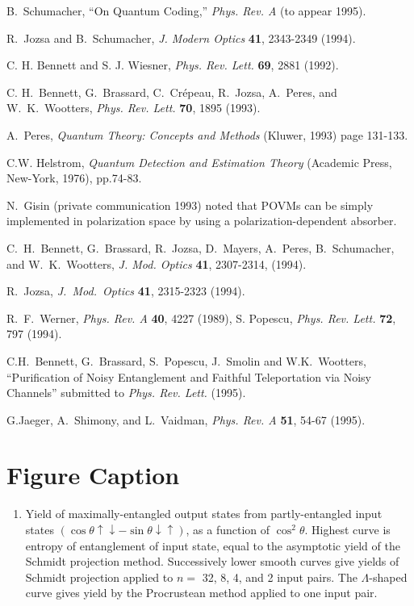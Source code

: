 \begin{thebibliography}{99}
 
 B.~Schumacher, ``On Quantum Coding,''
{\em Phys. Rev. A\/} (to appear 1995).
 
 R.~Jozsa and B.~Schumacher,
{\em J. Modern Optics\/} {\bf 41}, 2343-2349 (1994).
 
 C. H. Bennett and S. J. Wiesner, {\em Phys. Rev. Lett.\/}
{\bf69}, 2881 (1992).
 
 C. H.~Bennett, G.~Brassard, C.~Cr\'epeau, R.~Jozsa,
A.~Peres, and W.~K.~Wootters, {\em Phys. Rev. Lett.} {\bf 70}, 1895
(1993).
 
 A.~Peres, {\em Quantum Theory: Concepts and Methods\/}
(Kluwer, 1993) page 131-133.
 
 C.W. Helstrom,
{\em Quantum Detection and Estimation Theory}
(Academic Press, New-York, 1976), pp.74-83.
 
 N.~Gisin (private communication 1993) noted that
POVMs can be simply implemented in polarization space by
using a polarization-dependent absorber.
 
 C.~H.~Bennett, G.~Brassard, R.~Jozsa,
D.~Mayers, A.~Peres, B.~Schumacher, and W.~K.~Wootters,
{\em J. Mod. Optics\/} {\bf 41}, 2307-2314, (1994).
 
 R.~Jozsa, {\em J.~Mod.~Optics\/} {\bf 41}, 2315-2323 (1994).
 
 R.~F.~Werner, {\em Phys. Rev. A\/} {\bf 40},
4227 (1989), S. Popescu, {\em Phys. Rev. Lett.\/} {\bf 72}, 797 (1994).
 
 C.H.~Bennett, G.~Brassard, S.~Popescu, J.~Smolin and
W.K.~Wootters, ``Purification of Noisy Entanglement and Faithful
Teleportation via Noisy Channels'' submitted to {\em Phys. Rev. Lett.\/} (1995).
 
 G.Jaeger, A.~Shimony, and L.~Vaidman,
{\em Phys. Rev. A\/} {\bf 51}, 54-67 (1995).


\end{thebibliography}
\newpage
\section*{Figure Caption}
\begin{enumerate}
\item Yield of maximally-entangled output states from partly-entangled input
states $(\cos\theta \uparrow\downarrow-\sin\theta\downarrow\uparrow)$,
as a function of $\cos^2\theta$.
Highest curve is entropy of entanglement of input state,
equal to the asymptotic yield of the Schmidt projection method.
Successively lower smooth curves give yields of Schmidt projection
applied to $n=$ 32, 8, 4, and 2 input pairs.
The $\Lambda$-shaped curve gives yield by the Procrustean method
applied to one input pair.
\end{enumerate}


 
